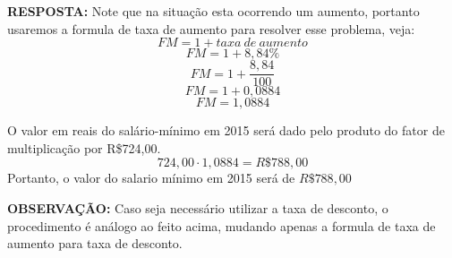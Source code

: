 \textbf{RESPOSTA:} Note que na situação esta ocorrendo um aumento, portanto usaremos a formula de taxa de aumento para resolver esse problema, veja:
$$FM=1+taxa~de~aumento$$
$$FM=1+8,84\%$$
$$FM=1+\frac{8,84}{100}$$
$$FM=1+0,0884$$
$$FM=1,0884$$

O valor em reais do salário-mínimo em 2015 será dado pelo produto do fator de multiplicação por R\$724,00.
$$ 724,00 \cdot 1,0884 = R\$ 788,00$$
Portanto, o valor do salario mínimo em 2015 será de $R\$788,00$

{\textbf{OBSERVAÇÃO:} Caso seja necessário utilizar a taxa de desconto, o procedimento é análogo ao feito acima, mudando apenas a formula de taxa de aumento para taxa de desconto.}
	



